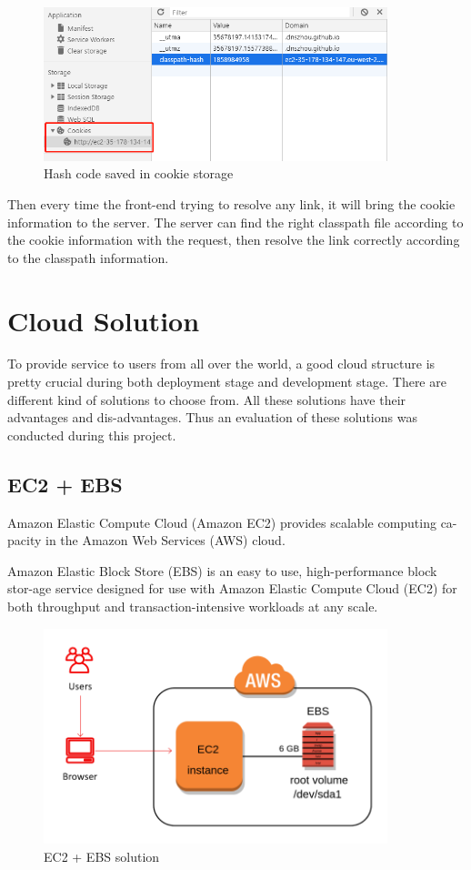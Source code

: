 \documentclass[runningheads]{llncs}
\begin{document}
\begin{figure}[H]
	\centering
	\includegraphics[width=10cm]{pic/cookie-storage.png}
	\caption{Hash code saved in cookie storage}
	\label{Hash code saved in cookie storage}
\end{figure}

Then every time the front-end trying to resolve any link, it will bring the cookie information to the server. The server can find the right classpath file according to the cookie information with the request, then resolve the link correctly according to the classpath information.

\section{Cloud Solution}

To provide service to users from all over the world, a good cloud structure is pretty crucial during both deployment stage and development stage. There are different kind of solutions to choose from. All these solutions have their advantages and dis-advantages. Thus an evaluation of these solutions was conducted during this project.

\subsection{EC2 + EBS}


Amazon Elastic Compute Cloud (Amazon EC2) provides scalable computing ca-pacity in the Amazon Web Services (AWS) cloud.\cite{AWSEC2}

Amazon Elastic Block Store (EBS) is an easy to use, high-performance block stor-age service designed for use with Amazon Elastic Compute Cloud (EC2) for both throughput and transaction-intensive workloads at any scale.\cite{AWSEBS}

\begin{figure}[H]
	\centering
	\includegraphics[width=10cm]{pic/ec2-ebs.png}
	\caption{EC2 + EBS solution}
	\label{EC2 + EBS solution}
\end{figure}
\end{document}
